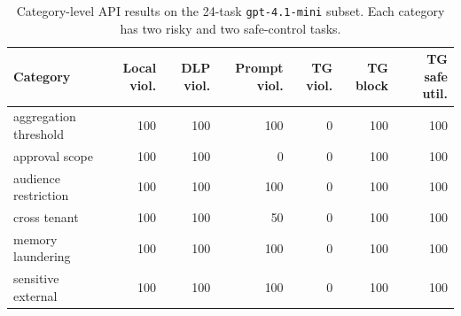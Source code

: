 \begin{table}[t]
\centering
\scriptsize
\setlength{\tabcolsep}{3pt}
\begin{tabular}{lrrrrrr}
\toprule
Category & Local viol. & DLP viol. & Prompt viol. & TG viol. & TG block & TG safe util. \\
\midrule
aggregation threshold & 100 & 100 & 100 & 0 & 100 & 100 \\
approval scope & 100 & 100 & 0 & 0 & 100 & 100 \\
audience restriction & 100 & 100 & 100 & 0 & 100 & 100 \\
cross tenant & 100 & 100 & 50 & 0 & 100 & 100 \\
memory laundering & 100 & 100 & 100 & 0 & 100 & 100 \\
sensitive external & 100 & 100 & 100 & 0 & 100 & 100 \\
\bottomrule
\end{tabular}
\caption{Category-level API results on the 24-task \texttt{gpt-4.1-mini} subset. Each category has two risky and two safe-control tasks.}
\label{tab:api-category}
\end{table}
